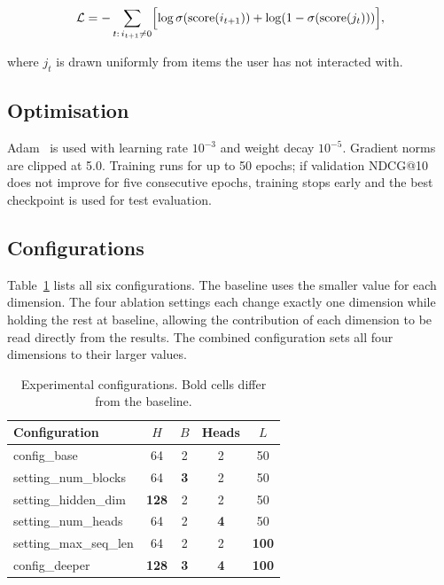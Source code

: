 \documentclass[sigconf]{acmart}
\begin{document}
\begin{align}
  \mathcal{L} = -\sum_{t:\, i_{t+1} \neq 0}
    \Bigl[
      \log \sigma(\text{score}(i_{t+1}))
      + \log(1 - \sigma(\text{score}(j_t)))
    \Bigr],
\end{align}

where $j_t$ is drawn uniformly from items the user has not interacted with.

\subsection{Optimisation}

Adam~\cite{kingma2015adam} is used with learning rate $10^{-3}$ and weight
decay $10^{-5}$. Gradient norms are clipped at 5.0. Training runs for up to 50
epochs; if validation NDCG@10 does not improve for five consecutive epochs,
training stops early and the best checkpoint is used for test evaluation.

\subsection{Configurations}

Table~\ref{tab:configs} lists all six configurations. The baseline uses the
smaller value for each dimension. The four ablation settings each change exactly
one dimension while holding the rest at baseline, allowing the contribution of
each dimension to be read directly from the results. The combined configuration
sets all four dimensions to their larger values.

\begin{table}[h]
\centering
\caption{Experimental configurations. Bold cells differ from the baseline.}
\label{tab:configs}
\begin{tabular}{lcccc}
\toprule
Configuration        & $H$   & $B$ & Heads & $L$   \\
\midrule
config\_base          & 64    & 2   & 2     & 50    \\
setting\_num\_blocks   & 64    & \textbf{3}   & 2     & 50    \\
setting\_hidden\_dim   & \textbf{128}  & 2   & 2     & 50    \\
setting\_num\_heads    & 64    & 2   & \textbf{4}     & 50    \\
setting\_max\_seq\_len  & 64    & 2   & 2     & \textbf{100}  \\
config\_deeper        & \textbf{128}  & \textbf{3}   & \textbf{4}     & \textbf{100}  \\
\bottomrule
\end{tabular}
\end{table}
\end{document}
